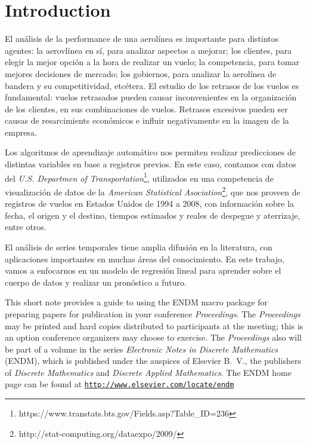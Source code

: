 \section{Introduction}\label{intro}

El an\'alisis de la performance de una aerol\'inea es importante para
distintos agentes: la aerovl\'inea en s\'i, para analizar aspectos a 
mejorar; los clientes, para elegir la mejor opci\'on a la hora de realizar
un vuelo; la competencia, para tomar mejores decisiones de mercado;
los gobiernos, para analizar la aerol\'inea de bandera y su 
competitividad, etc\'etera. El estudio de los retrasos de los vuelos
es fundamental: vuelos retrasados pueden causar inconvenientes en
la organizaci\'on de los clientes, en sus combinaciones de vuelos.
Retrasos excesivos pueden ser causas de resarcimients econ\'omicos
e influir negativamente en la imagen de la empresa.

Los algoritmos de aprendizaje autom\'atico nos permiten realizar
predicciones de distintas variables en base a registros previos.
En este caso, contamos con datos del \textit{U.S. Departmen
of Transportation}\footnote{https://www.transtats.bts.gov/Fields.asp?Table\_ID=236},
utilizados en una competencia de visualizaci\'on
de datos de la \textit{American Statistical Asociation}\footnote{
http://stat-computing.org/dataexpo/2009/}, que nos proveen
de registros de vuelos en Estados Unidos de 1994 a 2008, con
informaci\'on sobre la fecha, el origen y el destino, tiempos
estimados y reales de despegue y aterrizaje, entre otros.

El an\'alisis de series temporales tiene amplia difusi\'on en la
literatura, con aplicaciones importantes en muchas \'areas del
conocimiento. En este trabajo, vamos a enfocarnos en un modelo de regresi\'on
lineal para aprender sobre el cuerpo de datos y realizar un pron\'ostico
a futuro.





This short note provides a guide to using the ENDM macro package for
preparing papers for publication in your conference \emph{Proceedings}.
The \emph{Proceedings} may be printed and hard copies distributed to
participants at the meeting; this is an option conference organizers
may choose to exercise.  The \emph{Proceedings} also will be part of
a volume in the series \emph{Electronic Notes in Discrete Mathematics}
(ENDM), which is published under the auspices of Elsevier B.~V., the
publishers of \emph{Discrete Mathematics} and \emph{Discrete Applied
Mathematics}. The ENDM home page can be found at
\href{http://www.elsevier.com/locate/endm}
{\texttt{http://www.elsevier.com/locate/endm}}

